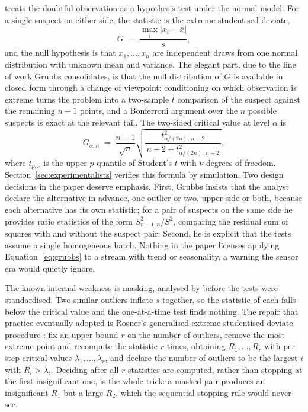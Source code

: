 \citet{grubbs1969} treats the doubtful observation as a hypothesis test under
the normal model. For a single suspect on either side, the statistic is the
extreme studentised deviate,
\begin{equation}
  G \;=\; \frac{\max_i \lvert x_i - \bar{x} \rvert}{s},
  \label{eq:grubbs}
\end{equation}
and the null hypothesis is that $x_1,\dots,x_n$ are independent draws from
one normal distribution with unknown mean and variance. The elegant part,
due to the line of work Grubbs consolidates, is that the null distribution of
$G$ is available in closed form through a change of viewpoint: conditioning
on which observation is extreme turns the problem into a two-sample $t$
comparison of the suspect against the remaining $n-1$ points, and a
Bonferroni argument over the $n$ possible suspects is exact at the relevant
tail. The two-sided critical value at level $\alpha$ is
\begin{equation}
  G_{\alpha,n} \;=\; \frac{n-1}{\sqrt{n}}
  \sqrt{\frac{t^2_{\alpha/(2n),\,n-2}}{\,n-2+t^2_{\alpha/(2n),\,n-2}\,}},
  \label{eq:grubbscrit}
\end{equation}
where $t_{p,\nu}$ is the upper $p$ quantile of Student's $t$ with $\nu$
degrees of freedom. Section~\ref{sec:experimentalists} verifies this formula
by simulation. Two design decisions in the paper deserve emphasis. First,
Grubbs insists that the analyst declare the alternative in advance, one
outlier or two, upper side or both, because each alternative has its own
statistic; for a pair of suspects on the same side he provides ratio
statistics of the form $S^2_{n-1,n}/S^2$, comparing the residual sum of
squares with and without the suspect pair. Second, he is explicit that the
tests assume a single homogeneous batch. Nothing in the paper licenses
applying Equation~\eqref{eq:grubbs} to a stream with trend or seasonality,
a warning the sensor era would quietly ignore.

The known internal weakness is masking, analysed by \citet{pearson1936}
before the tests were standardised. Two similar outliers inflate $s$
together, so the statistic of each falls below the critical value and the
one-at-a-time test finds nothing. The repair that practice eventually adopted
is Rosner's generalised extreme studentised deviate procedure
\citep{rosner1983}: fix an upper bound $r$ on the number of outliers, remove
the most extreme point and recompute the statistic $r$ times, obtaining
$R_1,\dots,R_r$ with per-step critical values $\lambda_1,\dots,\lambda_r$,
and declare the number of outliers to be the largest $i$ with
$R_i > \lambda_i$. Deciding after all $r$ statistics are computed, rather
than stopping at the first insignificant one, is the whole trick: a masked
pair produces an insignificant $R_1$ but a large $R_2$, which the sequential
stopping rule would never see.


